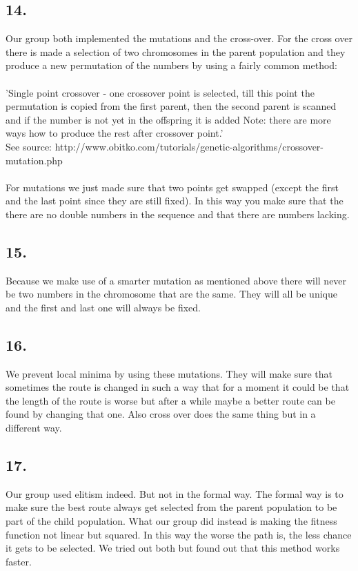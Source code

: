 \documentclass{scrartcl}
\begin{document}
\subsection*{14.}
Our group both implemented the mutations and the cross-over. For the cross over there is made a selection of two chromosomes in the parent population and they produce a new permutation of the numbers by using a fairly common method:\\
\\
'Single point crossover - one crossover point is selected, till this point the permutation is copied from the first parent, then the second parent is scanned and if the number is not yet in the offspring it is added
Note: there are more ways how to produce the rest after crossover point.'\\
See source: http://www.obitko.com/tutorials/genetic-algorithms/crossover-mutation.php\\
\\
For mutations we just made sure that two points get swapped (except the first and the last point since they are still fixed). In this way you make sure that the there are no double numbers in the sequence and that there are numbers lacking.

\subsection*{15.}
Because we make use of a smarter mutation as mentioned above there will never be two numbers in the chromosome that are the same. They will all be unique and the first and last one will always be fixed.

\subsection*{16.}
We prevent local minima by using these mutations. They will make sure that sometimes the route is changed in such a way that for a moment it could be that the length of the route is worse but after a while maybe a better route can be found by changing that one. Also cross over does the same thing but in a different way.

\subsection*{17.}
Our group used elitism indeed. But not in the formal way. The formal way is to make sure the best route always get selected from the parent population to be part of the child population. What our group did instead is making the fitness function not linear but squared. In this way the worse the path is, the less chance it gets to be selected. We tried out both but found out that this method works faster.
\end{document}
